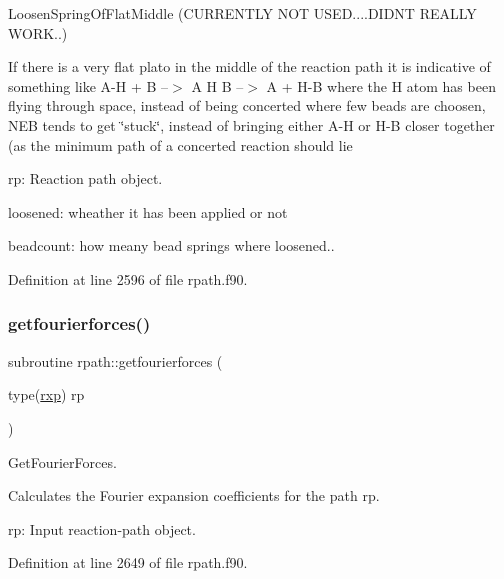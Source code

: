 Loosen\+Spring\+Of\+Flat\+Middle (C\+U\+R\+R\+E\+N\+T\+LY N\+OT U\+S\+ED....D\+I\+D\+NT R\+E\+A\+L\+LY W\+O\+RK..) 

If there is a very flat plato in the middle of the reaction path it is indicative of something like A-\/H + B --$>$ A H B --$>$ A + H-\/B where the H atom has been flying through space, instead of being concerted where few beads are choosen, N\+EB tends to get \char`\"{}stuck\char`\"{}, instead of bringing either A-\/H or H-\/B closer together (as the minimum path of a concerted reaction should lie


\begin{DoxyItemize}
\item rp\+: Reaction path object.
\item loosened\+: wheather it has been applied or not
\item beadcount\+: how meany bead springs where loosened.. 
\end{DoxyItemize}

Definition at line 2596 of file rpath.\+f90.

\mbox{\label{namespacerpath_a17575cd0e216ffd99d188bb982fd2efc}} 
\subsubsection{\texorpdfstring{getfourierforces()}{getfourierforces()}}
{\footnotesize\ttfamily subroutine rpath\+::getfourierforces (\begin{DoxyParamCaption}\item[{type(\mbox{\hyperlink{structrpath_1_1rxp}{rxp}})}]{rp }\end{DoxyParamCaption})}



Get\+Fourier\+Forces. 

Calculates the Fourier expansion coefficients for the path rp.


\begin{DoxyItemize}
\item rp\+: Input reaction-\/path object. 
\end{DoxyItemize}

Definition at line 2649 of file rpath.\+f90.

\mbox{\label{namespacerpath_a8808a2a9ef2cd749de76ec66e662cf4c}} 
